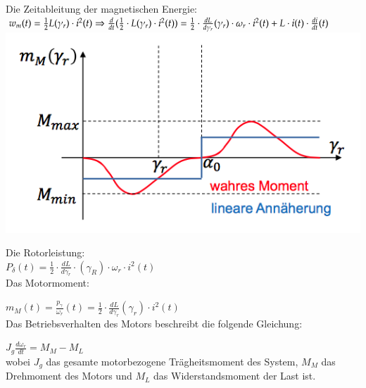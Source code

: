 \begin{minipage}{0.5 \linewidth}
Die Zeitableitung der magnetischen Energie: \\

$w_m(t) = \frac{1}{2} L(\gamma_r) \cdot i^2(t) \Rightarrow \frac{d}{dt}(\frac{1}{2}\cdot L(\gamma_r)\cdot i^2(t)) = \\
\frac{1}{2} \cdot \frac{dL}{d\gamma_r}(\gamma_r) \cdot \omega_r \cdot i^2(t) + L \cdot i(t) \cdot \frac{di}{dt}(t)$ \\

\includegraphics[width = \linewidth]{./Pics/VL67/Drehmoment5}
\end{minipage}
\begin{minipage}{0.5 \linewidth}
Die Rotorleistung: \\

$P_\delta (t) = \frac{1}{2} \cdot \frac{dL}{d\gamma_r}\cdot(\gamma_R) \cdot \omega_r \cdot i^2(t)$ \\

Das Motormoment: 

$m_M(t) = \frac{p_\gamma}{\omega_r}(t) = \frac{1}{2} \cdot \frac{dL}{d\gamma_r}(\gamma_r) \cdot i^2(t)$\\

Das Betriebsverhalten des Motors beschreibt die folgende Gleichung: 

$J_g \frac{d\omega_r}{dt} = M_M - M_L $\\

wobei $J_g$ das gesamte motorbezogene Trägheitsmoment des System, $M_M$ das Drehmoment des Motors und $M_L$ das Widerstandsmoment der Last ist.\\
\end{minipage}

